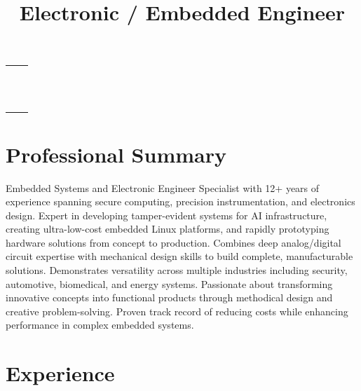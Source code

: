 \documentclass[10pt,letterpaper,roman]{moderncv}        %
\title{Electronic / Embedded Engineer}
\makeatletter
\renewcommand*{\makecvtitle}{%
  \vspace*{-15pt}
  \begin{tabularx}{\textwidth}{@{}X r@{}}
    \begin{minipage}{0.5\textwidth}
      {\Huge\textcolor{burgundy}{\textbf{\@firstname~\@lastname}}}\\[0.4em]
      {\large\color{gray}\textsc{\@title}}
    \end{minipage} &
    \begin{minipage}{0.48\textwidth}
      \raggedleft
      \ifthenelse{\isundefined{\@addressstreet}}{}{\addresssymbol\@addressstreet\\}%
      \ifthenelse{\isundefined{\@addresscity}}{}{\@addresscity\\}%
      \mobilesymbol+1~(215)~690~1415\\
      \ifthenelse{\isundefined{\@email}}{}{\emailsymbol\emaillink{\@email}\\}%
      \ifthenelse{\isundefined{\@homepage}}{}{\homepagesymbol\httplink{\@homepage}\\}%
      \ifthenelse{\isundefined{\@linkedinsocialsymbol}}{}{\@linkedinsocialsymbol\httplink{linkedin.com/in/\@linkedinsocial}\\}%
      \ifthenelse{\isundefined{\@twittersocialsymbol}}{}{\@twittersocialsymbol\httplink{twitter.com/\@twittersocial}\\}%
      \ifthenelse{\isundefined{\@githubsocialsymbol}}{}{\@githubsocialsymbol\httplink{github.com/\@githubsocial}\\}%
      \ifthenelse{\isundefined{\@signalsocialsymbol}}{}{\@signalsocialsymbol\@signalsocial\\}%
    \end{minipage}
  \end{tabularx}
  \par\vspace{2.5em}
}
\makeatother
\begin{document}
\makecvtitle



\section{Professional Summary}
 Embedded Systems and Electronic Engineer  Specialist with 12+ years of experience spanning secure computing, precision instrumentation, and electronics design. Expert in developing tamper-evident systems for AI infrastructure, creating ultra-low-cost embedded Linux platforms, and rapidly prototyping hardware solutions from concept to production. Combines deep analog/digital circuit expertise with mechanical design skills to build complete, manufacturable solutions. Demonstrates versatility across multiple industries including security, automotive, biomedical, and energy systems. Passionate about transforming innovative concepts into functional products through methodical design and creative problem-solving. Proven track record of reducing costs while enhancing performance in complex embedded systems.\newline

\section{Experience}
\end{document}
